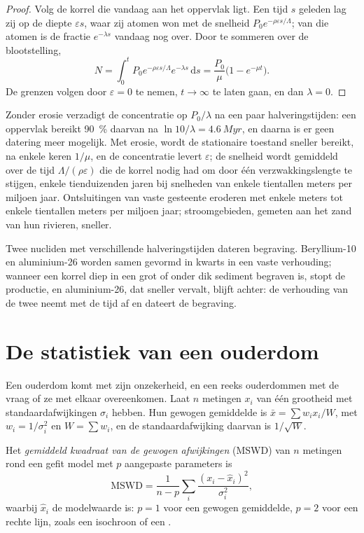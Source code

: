 \begin{proof}
Volg de korrel die vandaag aan het oppervlak ligt. Een tijd $s$ geleden lag zij op de
diepte $\varepsilon s$, waar zij atomen won met de snelheid $P_0e^{-\rho\varepsilon
s/\Lambda}$; van die atomen is de fractie $e^{-\lambda s}$ vandaag nog over. Door
te sommeren over de blootstelling,
\[
N = \int_0^t P_0e^{-\rho\varepsilon s/\Lambda}e^{-\lambda s}\,\mathrm ds
= \frac{P_0}{\mu}\bigl(1 - e^{-\mu t}\bigr).
\]
De grenzen volgen door $\varepsilon = 0$ te nemen, $t \to \infty$ te laten gaan, en
dan $\lambda = 0$.
\end{proof}

Zonder erosie verzadigt de concentratie op $P_0/\lambda$ na een paar
halveringstijden: een oppervlak bereikt \qty{90}{\percent} daarvan na $\ln 10/\lambda
= \qty{4.6}{Myr}$, en daarna is er geen datering meer mogelijk. Met erosie,
wordt de stationaire toestand sneller bereikt, na enkele keren $1/\mu$, en de
concentratie levert $\varepsilon$; de snelheid wordt gemiddeld over de tijd
$\Lambda/(\rho\varepsilon)$ die de korrel nodig had om door één
verzwakkingslengte te stijgen, enkele tienduizenden jaren bij snelheden van enkele
tientallen meters per miljoen jaar. Ontsluitingen van vaste gesteente eroderen met
enkele meters tot enkele tientallen meters per miljoen jaar; stroomgebieden, gemeten aan het
zand van hun rivieren, sneller.

Twee nucliden met verschillende halveringstijden dateren begraving. Beryllium-10 en
aluminium-26 worden samen gevormd in kwarts in een vaste verhouding; wanneer een korrel
diep in een grot of onder dik sediment begraven is, stopt de productie, en
aluminium-26, dat sneller vervalt, blijft achter: de verhouding van de twee
neemt met de tijd af en dateert de begraving.

\section{De statistiek van een ouderdom}\label{sec:b3:advanced-geochronology:statistics}

Een ouderdom komt met zijn onzekerheid, en een reeks ouderdommen met de vraag
of ze met elkaar overeenkomen. Laat $n$ metingen $x_i$ van één grootheid
met standaardafwijkingen $\sigma_i$ hebben. Hun gewogen gemiddelde is $\bar x = \sum w_ix_i/W$, met
$w_i = 1/\sigma_i^2$ en $W = \sum w_i$, en de standaardafwijking daarvan is
$1/\sqrt W$.

\begin{definition}\label{def:b3:advanced-geochronology:mswd}
Het \emph{gemiddeld kwadraat van de gewogen afwijkingen}
(MSWD) van $n$ metingen rond een gefit model met $p$ aangepaste parameters
is
\[
\mathrm{MSWD} = \frac{1}{n - p}\sum_i \frac{(x_i - \hat x_i)^2}{\sigma_i^2},
\]
waarbij $\hat x_i$ de modelwaarde is: $p = 1$ voor een gewogen gemiddelde, $p = 2$ voor
een rechte lijn, zoals een isochroon of een .
\end{definition}

